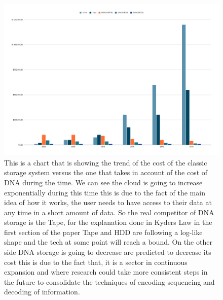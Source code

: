 \documentclass[10pt,twocolumn,twoside]{gsajnl}
\begin{document}
\begin{figure}[h!]
\centering
\includegraphics[width=\linewidth]{Figures/economicschart.png}
\caption{This is a chart that is showing the trend of the cost of the classic storage system versus the one that takes in
account of the cost of DNA during the time.
We can see the cloud is going to increase exponentially during this time this is due to the fact of the main idea of how
it works, the user needs to have access to their data at any time in a short amount of data. So the real competitor of
DNA storage is the Tape, for the explanation done in Kyders Law in the first section of the paper Tape and HDD are
following a log-like shape and the tech at some point will reach a bound. On the other side DNA storage is going
to decrease are predicted to decrease its cost this is due to the fact that, it is a sector in continuous expansion and
where research could take more consistent steps in the future to consolidate the techniques of encoding sequencing
and decoding of information.}
\label{fig:my_label9}
\end{figure}
\end{document}
